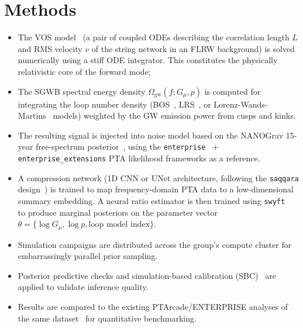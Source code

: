 \section{Methods}\label{sec:1-methods}
\begin{itemize}
    \item The VOS model~\cite{martins_extending_2002} (a pair of coupled ODEs describing the correlation length $L$ and RMS velocity $v$ of the string network in an FLRW background) is solved numerically using a stiff ODE integrator.
    This constitutes the physically relativistic core of the forward mode;
    \item The SGWB spectral energy density $\Omega_{\text{gw}}(f; G_\mu, p)$ is computed for integrating the loop number density (BOS~\cite{blanco-pillado_number_2014}, LRS~\cite{lorenz_cosmic_2010}, or Lorenz-Wands-Martins~\cite{ringeval_cosmological_2007} models) weighted by the GW emission power from cusps and kinks.
    \item The resulting signal is injected into noise model based on the NANOGrav 15-year free-spectrum posterior~\cite{johnson_nanograv_2024}, using the \texttt{enterprise}~\cite{ellis_enterprise_2020} + \texttt{enterprise\_extensions} PTA likelihood frameworks as a reference.
    \item A compression network (1D CNN or UNet architecture, following the \texttt{saqqara} design~\cite{alvey_simulationbased_2024}) is trained to map frequency-domain PTA data to a low-dimensional summary embedding.
    A neural ratio estimator is then trained using \texttt{swyft}~\cite{miller_swyft_2022} to produce marginal posteriors on the parameter vector $\theta = \{\log G_\mu, \log p, \text{loop model index} \}$.
    \item Simulation campaigns are distributed across the group's compute cluster for embarrassingly parallel prior sampling.
    \item Posterior predictive checks and simulation-based calibration (SBC)~\cite{talts_validating_2018} are applied to validate inference quality.
    \item Results are compared to the existing PTArcade/ENTERPRISE analyses of the same dataset~\cite{afzal_nanograv_2023,mitridate_ptarcade_2023} for quantitative benchmarking.

\end{itemize}
